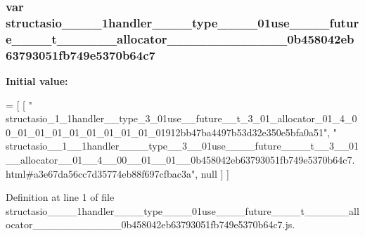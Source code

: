 \subsubsection[{structasio\+\_\+\+\_\+1\+\_\+\+\_\+1handler\+\_\+\+\_\+\+\_\+\+\_\+type\+\_\+\+\_\+3\+\_\+\+\_\+01use\+\_\+\+\_\+\+\_\+\+\_\+future\+\_\+\+\_\+\+\_\+\+\_\+t\+\_\+\+\_\+3\+\_\+\+\_\+01\+\_\+\+\_\+allocator\+\_\+\+\_\+01\+\_\+\+\_\+4\+\_\+\+\_\+00\+\_\+\+\_\+01\+\_\+\+\_\+01\+\_\+\+\_\+0b458042eb63793051fb749e5370b64c7}]{\setlength{\rightskip}{0pt plus 5cm}var structasio\+\_\+\+\_\+\_\+\+\_\+1handler\+\_\+\+\_\+\+\_\+\+\_\+type\+\_\+\+\_\+\_\+\+\_\+01use\+\_\+\+\_\+\+\_\+\+\_\+future\+\_\+\+\_\+\+\_\+\+\_\+t\+\_\+\+\_\+\_\+\+\_\+\_\+\+\_\+allocator\+\_\+\+\_\+\_\+\+\_\+\_\+\+\_\+\_\+\+\_\+\_\+\+\_\+\_\+\+\_\+0b458042eb63793051fb749e5370b64c7}\label{structasio____1____1handler________type____3____01use________future________t____3____01____alloc2c4add8131173778b6a2a79eb6e190fe_a10674710cc91b39d9fc199947a356369}
{\bfseries Initial value\+:}
\begin{DoxyCode}
=
[
    [ \textcolor{stringliteral}{"
      structasio\_1\_1handler\_\_type\_3\_01use\_\_future\_\_t\_3\_01\_allocator\_01\_4\_00\_01\_01\_01\_01\_01\_01\_01\_01\_01912bb47ba4497b53d32e350e5bfa0a51"}, \textcolor{stringliteral}{"
      structasio\_\_1\_\_1handler\_\_\_\_type\_\_3\_\_01use\_\_\_\_future\_\_\_\_t\_\_3\_\_01\_\_allocator\_\_01\_\_4\_\_00\_\_01\_\_01\_\_0b458042eb63793051fb749e5370b64c7.html#a3e67da56cc7d35774eb88f697cfbac3a"}, null ]
]
\end{DoxyCode}


Definition at line 1 of file structasio\+\_\+\+\_\+\_\+\+\_\+1handler\+\_\+\+\_\+\+\_\+\+\_\+type\+\_\+\+\_\+\_\+\+\_\+01use\+\_\+\+\_\+\+\_\+\+\_\+future\+\_\+\+\_\+\+\_\+\+\_\+t\+\_\+\+\_\+\_\+\+\_\+\_\+\+\_\+allocator\+\_\+\+\_\+\_\+\+\_\+\_\+\+\_\+\_\+\+\_\+\_\+\+\_\+\_\+\+\_\+0b458042eb63793051fb749e5370b64c7.\+js.


